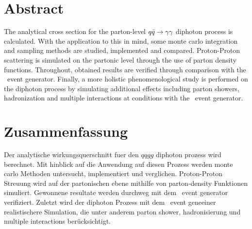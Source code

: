 \section*{Abstract}

The analytical cross section for the parton-level \(q\bar{q}\rightarrow\gamma\gamma\) diphoton
process is calculated.  With the application to this in mind, some
monte carlo integration and sampling methods are studied, implemented
and compared. Proton-Proton scattering is simulated on the partonic
level through the use of parton density functions. Throughout,
obtained results are verified through comparison with the \sherpa\
event generator. Finally, a more holistic phenomenological study is
performed on the diphoton process by simulating additional effects
including parton showers, hadronization and multiple interactions at
\lhc conditions with the \sherpa\ event generator.

\section*{Zusammenfassung}

Der analytische wirkungsquerschnitt fuer den \(qqgg\) diphoton prozess
wird berechnet. Mit hinblick auf die Anwendung auf diesen Prozess
werden monte carlo Methoden untersucht, implementiert und
verglichen. Proton-Proton Streuung wird auf der partonischen ebene
mithilfe von parton-density Funktionen simuliert.  Gewonnene resultate
werden durchweg mit dem \sherpa\ event generator verifiziert. Zuletzt
wird der diphoton Prozess mit dem \sherpa\ event geneeiner
realistischere Simulation, die unter anderem parton shower,
hadronisierung und multiple interactions ber\"ucksichtigt.
